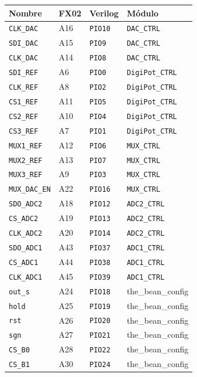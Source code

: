 \documentclass[11pt,letterpaper,spanish]{article}
\begin{document}
\clearpage
\begin{center}
\begin{longtable}{|l|l|l|l|}\hline
{\bf Nombre} & {\bf FX02} & {\bf Verilog}&{\bf Módulo} \\ \hline\hline
\verb=CLK_DAC= &A16&\verb+PIO10+& \verb+DAC_CTRL+ \\\hline
\verb=SDI_DAC= &A15&\verb+PIO9+& \verb+DAC_CTRL+ \\\hline
\verb=CLK_DAC= &A14&\verb+PIO8+& \verb+DAC_CTRL+ \\\hline
\verb=SDI_REF= &A6&\verb+PIO0+& \verb+DigiPot_CTRL+ \\\hline
\verb=CLK_REF= &A8&\verb+PIO2+& \verb+DigiPot_CTRL+ \\\hline
\verb=CS1_REF= &A11&\verb+PIO5+& \verb+DigiPot_CTRL+ \\\hline
\verb=CS2_REF= &A10&\verb+PIO4+& \verb+DigiPot_CTRL+ \\\hline
\verb=CS3_REF= &A7&\verb+PIO1+& \verb+DigiPot_CTRL+ \\\hline
\verb=MUX1_REF= &A12&\verb+PIO6+& \verb+MUX_CTRL+ \\\hline
\verb=MUX2_REF= &A13&\verb+PIO7+& \verb+MUX_CTRL+ \\\hline
\verb=MUX3_REF= &A9&\verb+PIO3+& \verb+MUX_CTRL+ \\\hline
\verb=MUX_DAC_EN= &A22&\verb+PIO16+& \verb+MUX_CTRL+ \\\hline
\verb=SDO_ADC2= &A18&\verb+PIO12+& \verb+ADC2_CTRL+ \\\hline
\verb=CS_ADC2= &A19&\verb+PIO13+& \verb+ADC2_CTRL+ \\\hline
\verb=CLK_ADC2= &A20&\verb+PIO14+& \verb+ADC2_CTRL+ \\\hline
\verb=SDO_ADC1= &A43&\verb+PIO37+& \verb+ADC1_CTRL+ \\\hline
\verb=CS_ADC1= &A44&\verb+PIO38+& \verb+ADC1_CTRL+ \\\hline
\verb=CLK_ADC1= &A45&\verb+PIO39+& \verb+ADC1_CTRL+ \\\hline
\verb=out_s= &A24&\verb+PIO18+& the\_bean\_config \\\hline
\verb=hold= &A25&\verb+PIO19+& the\_bean\_config \\\hline
\verb=rst= &A26&\verb+PIO20+& the\_bean\_config \\\hline
\verb=sgn= &A27&\verb+PIO21+& the\_bean\_config \\\hline
\verb=CS_B0= &A28&\verb+PIO22+& the\_bean\_config \\\hline
\verb=CS_B1= &A30&\verb+PIO24+& the\_bean\_config \\\hline

\end{longtable}
\end{center}
\end{document}
